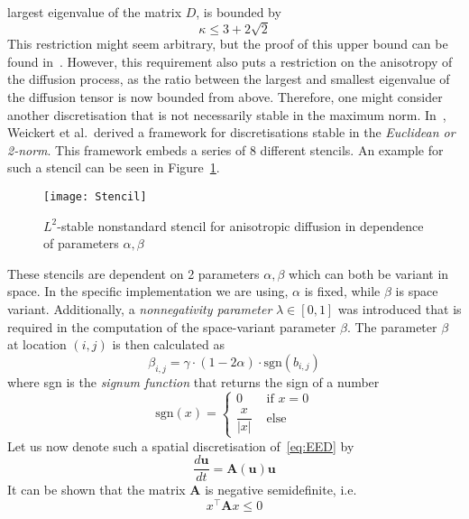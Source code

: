 largest eigenvalue of the matrix $D$, is bounded by 
\begin{equation}
    \kappa \leq 3 + 2\sqrt{2}
\end{equation}
This restriction might seem arbitrary, but the proof of this upper bound can be found
in~\cite{weickert96}.
However, this requirement also puts a restriction on the anisotropy of the diffusion process, as the
ratio between the largest and smallest eigenvalue of the diffusion tensor is now bounded from above.
Therefore, one might consider another discretisation that is not necessarily stable in
the maximum norm.
In~\cite{www13}, Weickert et al.\ derived a framework for discretisations stable in the
\textit{Euclidean or 2-norm}. This framework embeds a series of 8 different
stencils. An example for such a stencil can be seen in Figure~\ref{fig:Stencil}.
\begin{figure}[ht]
    \centering
    \texttt{[image: Stencil]}
    \caption{$L^2$-stable nonstandard stencil for anisotropic diffusion in dependence of parameters
    $\alpha, \beta$~\cite{www13}}\label{fig:Stencil}
\end{figure}
These stencils are dependent on 2 parameters $\alpha,\beta$ which can both be variant in space.
In the specific implementation we are using, $\alpha$ is fixed, while $\beta$ is space variant.
Additionally, a \textit{nonnegativity parameter} $\lambda \in [0,1]$ was introduced that is required
in the computation of the space-variant parameter $\beta$. \newpage\noindent
The parameter $\beta$ at location $(i,j)$ is then calculated as 
\begin{equation}\label{eq:Gamma}
    \beta_{i,j} = \gamma \cdot (1-2\alpha) \cdot \text{sgn}(b_{i,j})
\end{equation}
where sgn is the \textit{signum function} that returns the sign of a number
\begin{equation}
    \text{sgn}(x) = \begin{cases}
        0 & \text{ if } x = 0\\
        \dfrac{x}{\lvert x\rvert} & \text{ else }
    \end{cases}
\end{equation}
Let us now denote such a spatial discretisation of~\eqref{eq:EED} by 
\begin{equation}
    \frac{d\mathbf{u}}{dt} = \mathbf{A}(\mathbf{u})\mathbf{u}
\end{equation}
It can be shown that the matrix $\mathbf{A}$ is negative semidefinite, i.e.\  
\begin{equation*}
    x^\top \mathbf{A}x \leq 0
\end{equation*}
